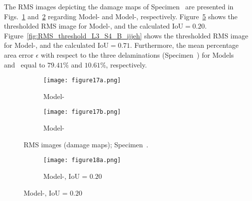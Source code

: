 \begin{sloppypar}
	The RMS images depicting the damage maps of Specimen~ are presented in Figs.~\ref{fig:RMS_L3_S4_B_saeed} and~\ref{fig:RMS_L3_S4_B_ijjeh} regarding Model- and Model-, respectively.
	Figure~\ref{fig:RMS_threshold_L3_S4_B_saeed} shows the thresholded RMS image for Model-, and the calculated IoU\(=0.20\).
	Figure~\ref{fig:RMS_threshold_L3_S4_B_ijjeh} shows the thresholded RMS image for Model-, and the calculated IoU\(=0.71\).
	Furthermore, the mean percentage area error \(\epsilon\) with respect to the three delaminations (Specimen~) for Models~ and~ equal to \(79.41\%\) and \(10.61\%\), respectively.
	\begin{figure} [!ht]
		\begin{subfigure}[b]{.49\textwidth}
			\centering
			\texttt{[image: figure17a.png]}
			\caption{Model-}
			\label{fig:RMS_L3_S4_B_saeed}
		\end{subfigure}
		\hfill
		\begin{subfigure}[b]{.49\textwidth}
			\centering
			\texttt{[image: figure17b.png]}
			\caption{Model-} 
			\label{fig:RMS_L3_S4_B_ijjeh}
		\end{subfigure}
		\caption{RMS images (damage maps); Specimen~.}
		\label{fig:RMS_L3_S4_B__images}
	\end{figure} 
	\begin{figure} [!ht]
		\begin{subfigure}[b]{.49\textwidth}
			\centering
			\hspace*{-10mm}
			\texttt{[image: figure18a.png]}
			\caption{Model-, IoU = \(0.20\)}
			\label{fig:RMS_threshold_L3_S4_B_saeed}

\end{subfigure}
\end{figure}
\end{sloppypar}
